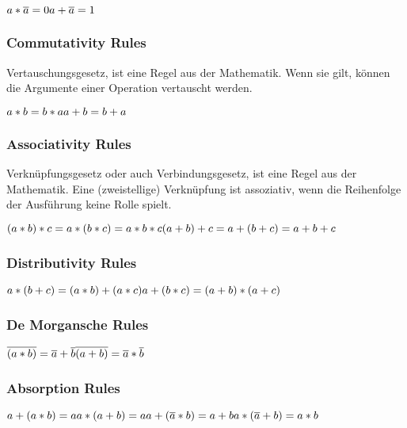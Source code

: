 \documentclass[11pt]{article}
\begin{document}
\(a*\overline{a} = 0 \\  a+\overline{a} = 1\)

\subsubsection{Commutativity Rules}\label{commutativity-rules}

Vertauschungsgesetz, ist eine Regel aus der Mathematik. Wenn sie gilt,
können die Argumente einer Operation vertauscht werden.

\(a*b = b*a \\  a+b = b+a\)

\subsubsection{Associativity Rules}\label{associativity-rules}

Verknüpfungsgesetz oder auch Verbindungsgesetz, ist eine Regel aus der
Mathematik. Eine (zweistellige) Verknüpfung ist assoziativ, wenn die
Reihenfolge der Ausführung keine Rolle spielt.

\((a*b)*c = a*(b*c) = a*b*c \\  (a+b)+c = a+(b+c) = a+b+c\)

\subsubsection{Distributivity Rules}\label{distributivity-rules}

\(a*(b+c) = (a*b)+(a*c) \\  a+(b*c) = (a+b)*(a+c)\)

\subsubsection{De Morgansche Rules}\label{de-morgansche-rules}

\(\overline{(a*b)} = \overline{a}+\overline{b} \\  \overline{(a+b)} = \overline{a}*\overline{b}\)

\subsubsection{Absorption Rules}\label{absorption-rules}

\(a+(a*b) = a \\  a*(a+b) = a \\  a+(\overline{a}*b) = a+b \\  a*(\overline{a}+b) = a*b\)
\end{document}
